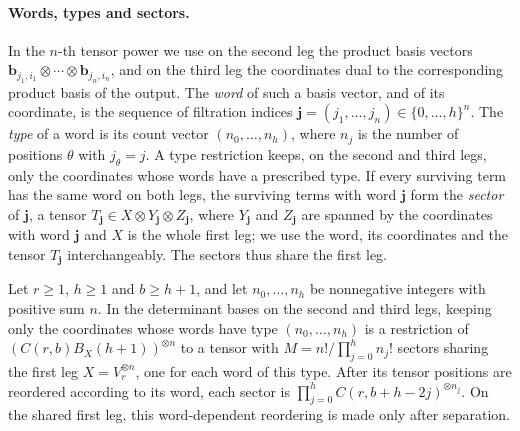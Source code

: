 \paragraph{Words, types and sectors.}
In the \(n\)-th tensor power we use on the second leg the product basis
vectors \(\mathbf b_{j_1,i_1}\otimes\cdots\otimes\mathbf b_{j_n,i_n}\), and
on the third leg the coordinates dual to the corresponding product basis
of the output. The \emph{word} of such a basis vector, and of its
coordinate, is the sequence of filtration indices
\(\mathbf j=(j_1,\ldots,j_n)\in\{0,\ldots,h\}^n\). The \emph{type} of a
word is its count vector \((n_0,\ldots,n_h)\), where \(n_j\) is the number
of positions \(\theta\) with \(j_\theta=j\). A type restriction keeps, on the
second and third legs, only the coordinates whose words have a prescribed
type. If every surviving term has the same word on both legs, the
surviving terms with word \(\mathbf j\) form the \emph{sector} of
\(\mathbf j\), a tensor
\(T_{\mathbf j}\in X\otimes Y_{\mathbf j}\otimes Z_{\mathbf j}\), where
\(Y_{\mathbf j}\) and \(Z_{\mathbf j}\) are spanned by the coordinates
with word \(\mathbf j\) and \(X\) is the whole first leg; we use the word,
its coordinates and the tensor \(T_{\mathbf j}\) interchangeably. The
sectors thus share the first leg.

\begin{lemma}\label{lem:multiway}\label{lem:determinant}
Let \(r\ge1\), \(h\ge1\) and \(b\ge h+1\), and let \(n_0,\ldots,n_h\) be
nonnegative integers with positive sum \(n\). In the determinant bases on
the second and third legs, keeping only the coordinates whose words have
type \((n_0,\ldots,n_h)\) is a restriction of
\((C(r,b)B_X(h+1))^{\otimes n}\) to a tensor with
\(M=n!/\prod_{j=0}^hn_j!\) sectors sharing the first leg
\(X=V_r^{\otimes n}\), one for each word of this type. After its tensor
positions are reordered according to its word, each sector is
\(\prod_{j=0}^hC(r,b+h-2j)^{\otimes n_j}\). On the shared first leg, this
word-dependent reordering is made only after separation.
\end{lemma}

